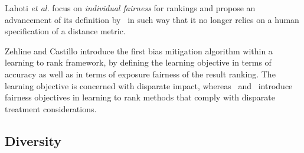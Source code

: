 Lahoti {\em et al.} \citet{lahoti2019operationalizing} focus on \emph{individual fairness} for rankings and propose an advancement of its definition by~\citet{Dwork2012} in such way that it no longer relies on a human specification of a distance metric.

Zehline and Castillo \citet{zehlike2018reducing} introduce the first bias mitigation algorithm within a learning to rank framework, by defining the learning objective in terms of accuracy as well as in terms of exposure fairness of the result ranking.
%
The learning objective is concerned with disparate impact, whereas~\citet{beutel2019fairness} and~\citet{singh2019policy} introduce fairness objectives in learning to rank methods that comply with disparate treatment considerations.

\subsection{Diversity}

